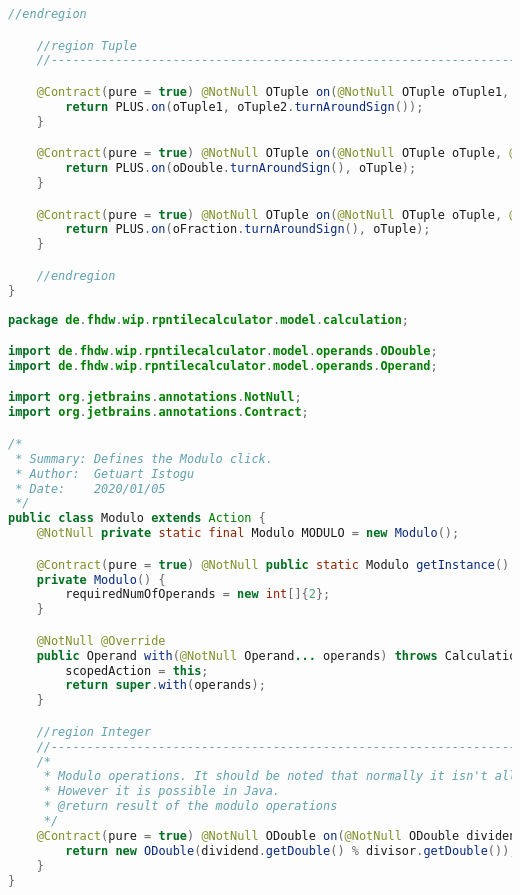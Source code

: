 \begin{lstlisting}[caption=Minus (Schwenke),label=list:Minus,language=Java]
    //endregion

    //region Tuple
    //------------------------------------------------------------------------------------

    @Contract(pure = true) @NotNull OTuple on(@NotNull OTuple oTuple1, @NotNull OTuple oTuple2) {
        return PLUS.on(oTuple1, oTuple2.turnAroundSign());
    }

    @Contract(pure = true) @NotNull OTuple on(@NotNull OTuple oTuple, @NotNull ODouble oDouble) {
        return PLUS.on(oDouble.turnAroundSign(), oTuple);
    }

    @Contract(pure = true) @NotNull OTuple on(@NotNull OTuple oTuple, @NotNull OFraction oFraction) {
        return PLUS.on(oFraction.turnAroundSign(), oTuple);
    }

    //endregion
}
\end{lstlisting}    

\begin{lstlisting}[caption=Modulo (Istogu),label=list:Modulo,language=Java]
package de.fhdw.wip.rpntilecalculator.model.calculation;

import de.fhdw.wip.rpntilecalculator.model.operands.ODouble;
import de.fhdw.wip.rpntilecalculator.model.operands.Operand;

import org.jetbrains.annotations.NotNull;
import org.jetbrains.annotations.Contract;

/*
 * Summary: Defines the Modulo click.
 * Author:  Getuart Istogu
 * Date:    2020/01/05
 */
public class Modulo extends Action {
    @NotNull private static final Modulo MODULO = new Modulo();

    @Contract(pure = true) @NotNull public static Modulo getInstance() { return MODULO; }
    private Modulo() {
        requiredNumOfOperands = new int[]{2};
    }

    @NotNull @Override
    public Operand with(@NotNull Operand... operands) throws CalculationException {
        scopedAction = this;
        return super.with(operands);
    }

    //region Integer
    //------------------------------------------------------------------------------------
    /*
     * Modulo operations. It should be noted that normally it isn't allow to modulo with floating numbers.
     * However it is possible in Java.
     * @return result of the modulo operations
     */
    @Contract(pure = true) @NotNull ODouble on(@NotNull ODouble dividend, @NotNull ODouble divisor) {
        return new ODouble(dividend.getDouble() % divisor.getDouble());
    }
}
\end{lstlisting}    

